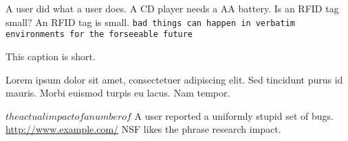 \begin{comment}
some bad stuff that is in the comment environment and should be ignored.
we we
behavior
fashion
\end{comment}
A user did what a user does.  %
A CD player needs a AA battery.  %
Is an RFID tag small?
An RFID tag is small.
\verb+bad things can happen in verbatim environments for the forseeable future+
\caption{This caption is short.}
\caption[Lorem ipsum dolor sit amet.]{Lorem ipsum dolor sit amet, consectetuer adipiscing elit. Sed tincidunt purus id mauris. Morbi euismod turpis eu lacus. Nam tempor.}
$the actual impact of a number of$ %
A user reported a uniformly stupid set of bugs.
\url{http://www.example.com/}
NSF likes the phrase research impact.
